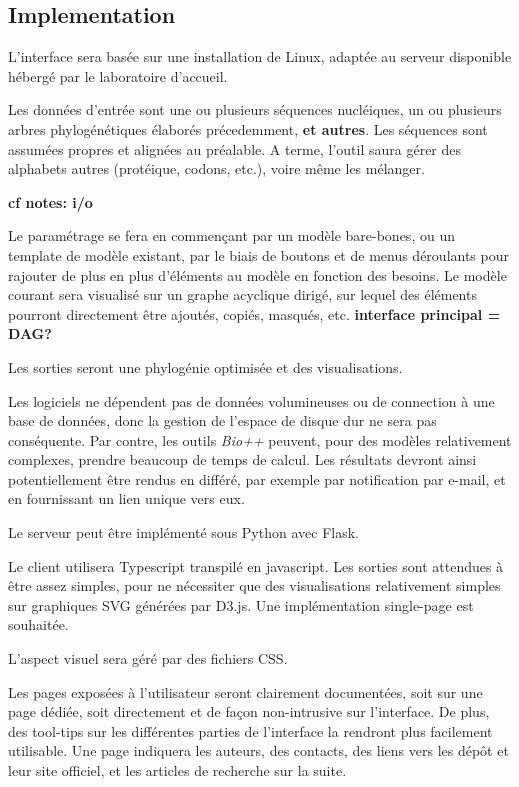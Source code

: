 \subsection{Implementation}

L'interface sera basée sur une installation de Linux,
adaptée au serveur disponible hébergé par le laboratoire d'accueil.

Les données d'entrée sont une ou plusieurs séquences nucléiques,
un ou plusieurs arbres phylogénétiques élaborés précedemment,
\textbf{et autres}.
Les séquences sont assumées propres et alignées au préalable.
A terme, l'outil saura gérer des alphabets autres
(protéique, codons, etc.),
voire même les mélanger.

\textbf{cf notes: i/o}

Le paramétrage se fera en commençant par un modèle bare-bones,
ou un template de modèle existant,
par le biais de boutons et de menus déroulants
pour rajouter de plus en plus d'éléments au modèle
en fonction des besoins.
Le modèle courant sera visualisé sur un graphe acyclique dirigé,
sur lequel des éléments pourront directement être ajoutés,
copiés, masqués, etc.
\textbf{interface principal = DAG?}

Les sorties seront une phylogénie optimisée
et des visualisations.

Les logiciels ne dépendent pas de données volumineuses
ou de connection à une base de données,
donc la gestion de l'espace de disque dur ne sera pas conséquente.
Par contre, les outils \textit{Bio++} peuvent,
pour des modèles relativement complexes,
prendre beaucoup de temps de calcul.
Les résultats devront ainsi potentiellement
être rendus en différé,
par exemple par notification par e-mail,
et en fournissant un lien unique vers eux.

Le serveur peut être implémenté sous Python avec Flask.

Le client utilisera Typescript transpilé en javascript.
Les sorties sont attendues à être assez simples,
pour ne nécessiter que des visualisations relativement simples
sur graphiques SVG générées par D3.js.
Une implémentation single-page est souhaitée.

L'aspect visuel sera géré par des fichiers CSS.

Les pages exposées à l'utilisateur seront clairement documentées,
soit sur une page dédiée,
soit directement et de façon non-intrusive sur l'interface.
De plus, des tool-tips sur les différentes parties de l'interface
la rendront plus facilement utilisable.
Une page indiquera les auteurs, des contacts,
des liens vers les dépôt et leur site officiel,
et les articles de recherche sur la suite.

